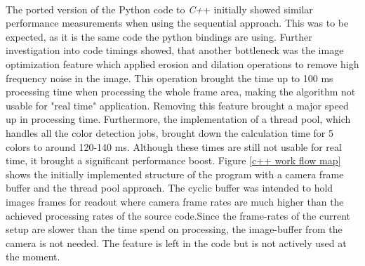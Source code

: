 \\The ported version of the Python code to\textit{ C+}+ initially showed similar performance measurements when using the sequential approach. This was to be expected, as it is the same code the python bindings are using. Further investigation into code timings showed, that another bottleneck was the image optimization feature which applied erosion and dilation operations to remove high frequency noise in the image. This operation brought the time up to 100 ms processing time when processing the whole frame area, making the algorithm  not usable for "real time" application. Removing this feature brought a major speed up in processing time. 
Furthermore, the implementation of a thread pool, which handles all the color detection jobs, brought down the calculation time for 5 colors to around 120-140 ms. Although these times are still not usable for real time, it brought a significant performance boost. Figure \ref{c++ work flow map} shows the initially implemented structure of the program with a camera frame buffer and the thread pool approach. The cyclic buffer was intended to hold images frames for readout where camera frame rates are much higher than the achieved processing rates of the source code.Since the frame-rates of the current setup are slower than the time  spend on processing, the image-buffer from the camera is not needed. The feature is left in the code but is not actively used at the moment.
